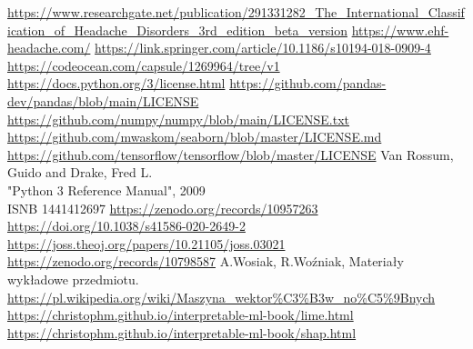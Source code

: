 \listoffigures

\begin{thebibliography}{10}
     \url{https://www.researchgate.net/publication/291331282_The_International_Classification_of_Headache_Disorders_3rd_edition_beta_version}
     \url{https://www.ehf-headache.com/}
     \url{https://link.springer.com/article/10.1186/s10194-018-0909-4}
     \url{https://codeocean.com/capsule/1269964/tree/v1}
     \url{https://docs.python.org/3/license.html}
     \url{https://github.com/pandas-dev/pandas/blob/main/LICENSE}
     \url{https://github.com/numpy/numpy/blob/main/LICENSE.txt}
     \url{https://github.com/mwaskom/seaborn/blob/master/LICENSE.md}
     \url{https://github.com/tensorflow/tensorflow/blob/master/LICENSE}
     Van Rossum, Guido and Drake, Fred L.\\
    "Python 3 Reference Manual", 2009\\
    ISNB 1441412697
     \url{https://zenodo.org/records/10957263}
     \url{https://doi.org/10.1038/s41586-020-2649-2}
     \url{https://joss.theoj.org/papers/10.21105/joss.03021}
     \url{https://zenodo.org/records/10798587}
     A.Wosiak, R.Woźniak, Materiały wykładowe przedmiotu.
     \url{https://pl.wikipedia.org/wiki/Maszyna_wektor%C3%B3w_no%C5%9Bnych}
     \url{https://christophm.github.io/interpretable-ml-book/lime.html}
     \url{https://christophm.github.io/interpretable-ml-book/shap.html}
\end{thebibliography}
